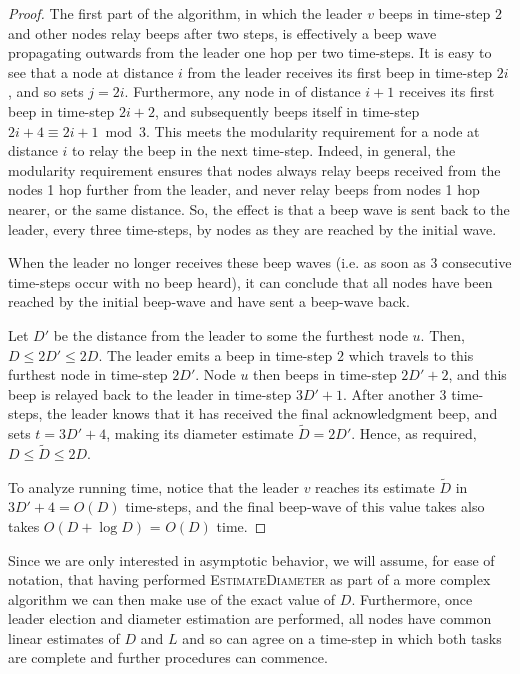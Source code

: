 \documentclass{article}
\begin{document}
\begin{proof}
	The first part of the algorithm, in which the leader $v$ beeps in time-step $2$ and other nodes relay beeps after two steps, is effectively a beep wave propagating outwards from the leader one hop per two time-steps. It is easy to see that a node at distance $i$ from the leader receives its first beep in time-step $2i$, and so sets $j=2i$. Furthermore, any node in of distance $i+1$ receives its first beep in time-step $2i+2$, and subsequently beeps itself in time-step $2i+4 \equiv 2i+1 \bmod 3$. This meets the modularity requirement for a node at distance $i$ to relay the beep in the next time-step. Indeed, in general, the modularity requirement ensures that nodes always relay beeps received from the nodes 1 hop further from the leader, and never relay beeps from nodes 1 hop nearer, or the same distance. So, the effect is that a beep wave is sent back to the leader, every three time-steps, by nodes as they are reached by the initial wave.
	
	When the leader no longer receives these beep waves (i.e. as soon as 3 consecutive time-steps occur with no beep heard), it can conclude that all nodes have been reached by the initial beep-wave and have sent a beep-wave back. 
	
	Let $D'$ be the distance from the leader to some the furthest node $u$. Then, $D\le 2D' \le 2D$. The leader emits a beep in time-step $2$ which travels to this furthest node in time-step $2D'$. Node $u$ then beeps in time-step $2D'+2$, and this beep is relayed back to the leader in time-step $3D'+1$. After another $3$ time-steps, the leader knows that it has received the final acknowledgment beep, and sets $t=3D'+4$, making its diameter estimate $\tilde{D} = 2D'$. Hence, as required, $D\le \tilde{D}\le 2D$.
	
	To analyze running time, notice that the leader $v$ reaches its estimate $\tilde D$ in $3D'+4 = O(D)$ time-steps, and the final beep-wave of this value takes also takes $O(D + \log D)$ = $O(D)$ time.
\end{proof}

Since we are only interested in asymptotic behavior, we will assume, for ease of notation, that having performed \textsc{EstimateDiameter} as part of a more complex algorithm we can then make use of the exact value of $D$. Furthermore, once leader election and diameter estimation are performed, all nodes have common linear estimates of $D$ and $L$ and so can agree on a time-step in which both tasks are complete and further procedures can commence.
\end{document}
